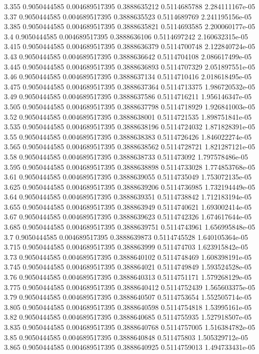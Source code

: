 {3.355 0.9050444585 0.004689517395 0.3888635212 0.5114685788 2.284111167e-05
3.37 0.9050444585 0.004689517395 0.3888635523 0.5114689769 2.241195156e-05
3.385 0.9050444585 0.004689517395 0.3888635821 0.5114693585 2.200060177e-05
3.4 0.9050444585 0.004689517395 0.3888636106 0.5114697242 2.160632315e-05
3.415 0.9050444585 0.004689517395 0.3888636379 0.5114700748 2.122840724e-05
3.43 0.9050444585 0.004689517395 0.3888636642 0.5114704108 2.086617499e-05
3.445 0.9050444585 0.004689517395 0.3888636893 0.5114707329 2.051897551e-05
3.46 0.9050444585 0.004689517395 0.3888637134 0.5114710416 2.018618495e-05
3.475 0.9050444585 0.004689517395 0.3888637364 0.5114713375 1.986720532e-05
3.49 0.9050444585 0.004689517395 0.3888637586 0.5114716211 1.956146347e-05
3.505 0.9050444585 0.004689517395 0.3888637798 0.5114718929 1.926841003e-05
3.52 0.9050444585 0.004689517395 0.3888638001 0.5114721535 1.898751841e-05
3.535 0.9050444585 0.004689517395 0.3888638196 0.5114724032 1.871828391e-05
3.55 0.9050444585 0.004689517395 0.3888638383 0.5114726426 1.846022274e-05
3.565 0.9050444585 0.004689517395 0.3888638562 0.5114728721 1.821287121e-05
3.58 0.9050444585 0.004689517395 0.3888638733 0.511473092 1.797578486e-05
3.595 0.9050444585 0.004689517395 0.3888638898 0.5114733028 1.774853768e-05
3.61 0.9050444585 0.004689517395 0.3888639055 0.5114735049 1.753072135e-05
3.625 0.9050444585 0.004689517395 0.3888639206 0.5114736985 1.732194449e-05
3.64 0.9050444585 0.004689517395 0.3888639351 0.5114738842 1.712183194e-05
3.655 0.9050444585 0.004689517395 0.388863949 0.5114740621 1.693002414e-05
3.67 0.9050444585 0.004689517395 0.3888639623 0.5114742326 1.674617644e-05
3.685 0.9050444585 0.004689517395 0.3888639751 0.5114743961 1.656995848e-05
3.7 0.9050444585 0.004689517395 0.3888639873 0.5114745528 1.640105364e-05
3.715 0.9050444585 0.004689517395 0.388863999 0.511474703 1.623915842e-05
3.73 0.9050444585 0.004689517395 0.3888640102 0.5114748469 1.608398191e-05
3.745 0.9050444585 0.004689517395 0.388864021 0.5114749849 1.593524528e-05
3.76 0.9050444585 0.004689517395 0.3888640313 0.5114751171 1.579268129e-05
3.775 0.9050444585 0.004689517395 0.3888640412 0.5114752439 1.565603375e-05
3.79 0.9050444585 0.004689517395 0.3888640507 0.5114753654 1.552505714e-05
3.805 0.9050444585 0.004689517395 0.3888640598 0.5114754818 1.53995161e-05
3.82 0.9050444585 0.004689517395 0.3888640685 0.5114755935 1.527918507e-05
3.835 0.9050444585 0.004689517395 0.3888640768 0.5114757005 1.516384782e-05
3.85 0.9050444585 0.004689517395 0.3888640848 0.511475803 1.505329712e-05
3.865 0.9050444585 0.004689517395 0.3888640925 0.5114759013 1.494733431e-05
}
